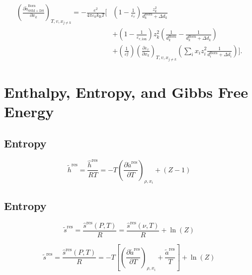 \documentclass[12pt, letterpaper]{article}
\begin{document}
\cite{Figiel2025}

\begin{equation}
\begin{aligned}
\left(\frac{\partial \tilde a_{\mathrm{SSM+DS}}^{\mathrm{Born}}}{\partial x_{k}}\right)_{T,v,x_{j\neq k}}
=
-\frac{e^{2}}{4\pi\varepsilon_{0}k_{\mathrm{B}}T}
\Bigg[
&\left(1-\frac{1}{\varepsilon_{r}}\right)\frac{z_{k}^{2}}{d_{k}^{\mathrm{Born}}+\Delta d_{k}}
\\
&+\left(1-\frac{1}{\varepsilon_{r,\mathrm{ion}}}\right) z_{k}^{2}
\left(\frac{1}{d_{k}^{\mathrm{Born}}}-\frac{1}{d_{k}^{\mathrm{Born}}+\Delta d_{k}}\right)
\\
&+\left(\frac{1}{\varepsilon_{r}^{2}}\right)
\left(\frac{\partial \varepsilon_{r}}{\partial x_{k}}\right)_{T,v,x_{j\neq k}}
\left(\sum_{i} x_{i} z_{i}^{2}\frac{1}{d_{i}^{\mathrm{Born}}+\Delta d_{i}}\right)
\Bigg].
\end{aligned}
\end{equation}

\section{Enthalpy, Entropy, and Gibbs Free Energy}

\subsection{Entropy}

\begin{equation}
\tilde{h}^{\mathrm{res}} = \frac{\hat{h}^{\mathrm{res}}}{RT}=-T\left(\frac{\partial\tilde{a}^{\mathrm{res}}}{\partial T}\right)_{\rho,x_i}+(Z-1)
\end{equation}

\subsection{Entropy}

\begin{equation}
\tilde{s}^{\mathrm{res}} = \frac{\hat{s}^{\mathrm{res}}(P,T)}{R}=\frac{\hat{s}^{\mathrm{res}}(\nu,T)}{R}+\ln(Z)
\end{equation}

\begin{equation}
\tilde{s}^{\mathrm{res}} = \frac{\hat{s}^{\mathrm{res}}(P,T)}{R}=-T\left[\left(\frac{\partial\tilde{a}^{\mathrm{res}}}{\partial T}\right)_{\rho,x_{i}}+\frac{\tilde{a}^{\mathrm{res}}}{T}\right]+\ln(Z)
\end{equation}
\end{document}
